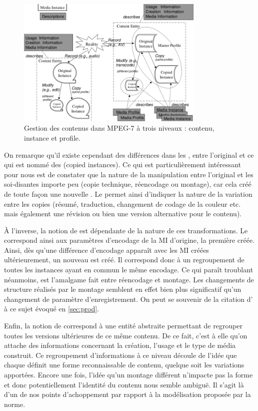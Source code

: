 \begin{figure}[ht!]
\centering
\includegraphics[width=0.8\textwidth]{images/MPEG-7-MediaManagement.png}
\caption{Gestion des contenus dans MPEG-7 à trois niveaux : contenu, instance et profile.}
\label{img:soa:media}
\end{figure}


On remarque qu'il existe cependant des différences dans les , entre l'original et ce qui est nommé des  (copied instances). 
Ce qui est particulièrement intéressant pour nous est de constater que la nature de la manipulation entre l'original et les soi-disantes  importe peu (copie technique, réencodage ou montage), car cela créé de toute façon une nouvelle . 
Le  permet ainsi d'indiquer la nature de la variation entre les copies (résumé, traduction, changement de codage de la couleur etc. mais également une révision ou bien une version alternative pour le contenu).

À l'inverse, la notion de  est dépendante de la nature de ces transformations. 
Le  correspond ainsi aux paramètres d'encodage de la MI d'origine, la première créée. 
Ainsi, dès qu'une différence d'encodage apparaît avec les MI créées ultérieurement, un nouveau  est créé. 
Il correspond donc à un regroupement de toutes les instances ayant en commun le même encodage. 
Ce qui paraît troublant néanmoins, est l'amalgame fait entre réencodage et montage. 
Les changements de structure réalisés par le montage semblent en effet bien plus significatif qu'un changement de paramètre d'enregistrement. 
On peut se souvenir de la citation d' à ce sujet évoqué en \ref{sec:prod}.

Enfin, la notion de  correspond à une entité abstraite permettant de regrouper toutes les versions ultérieures de ce même contenu.
De ce fait, c'est à elle qu'on attache des informations concernant la création, l'usage et le type de média construit. %
Ce regroupement d'informations à ce niveau découle de l'idée que chaque  définit une forme reconnaissable de contenu, quelque soit les variations apportées.
Encore une fois, l'idée qu'un montage différent n'impacte pas la forme et donc potentiellement l'identité du contenu nous semble ambiguë. 
Il s'agit là d'un de nos points d'achoppement par rapport à la modélisation proposée par la norme. 




